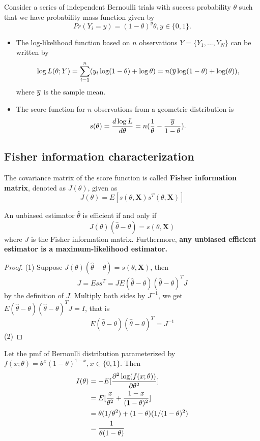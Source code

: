\begin{refsection}
\begin{example}
Consider a series of independent Bernoulli trials with success probability $\theta$ such that we have probability mass function given by	
$$Pr(Y_i = y) = (1-\theta)^y \theta, y\in \{0,1 \}.$$

\begin{itemize}
	\item 
	The log-likelihood function based on $n$ observations $Y=\{Y_1,...,Y_N\}$ can be written by
	$$\log L(\theta; Y) = \sum_{i=1}^n (y_i \log(1-\theta) + \log \theta) = n(\overline{y}\log(1-\theta) + \log(\theta)),$$
	where $\overline{y}$ is the sample mean.
	\item 
	The score function for $n$ observations from a geometric distribution is
	$$s(\theta) = \frac{d \log L}{d \theta} = n(\frac{1}{\theta} - \frac{\overline{y}}{1-\theta}).$$
\end{itemize}
\end{example}


\subsection{Fisher information characterization}
\begin{definition}
The covariance matrix of the score function is called \textbf{Fisher information matrix}, denoted as $J(\theta)$, given as
$$J(\theta) = E[s(\theta,\bm{X})s^T(\theta,\bm{X})]$$
\end{definition}


\begin{theorem}\cite[552]{moon2000mathematical}
	An unbiased estimator $\hat{\theta}$ is efficient if and only if 
	$$J(\theta)(\hat{\theta}-\theta) = s(\theta,\bm{X})$$
	where $J$ is the Fisher information matrix.
	Furthermore, \textbf{any unbiased efficient estimator is a maximum-likelihood estimator.}
\end{theorem}
\begin{proof}
(1) Suppose $J(\theta)(\hat{\theta}-\theta) = s(\theta,\bm{X})$, then $$J = Ess^T = JE(\hat{\theta}-\theta)(\hat{\theta}-\theta)^T J$$
by the definition of $J$. Multiply both sides by $J^{-1}$, we get $E(\hat{\theta}-\theta)(\hat{\theta}-\theta)^T J = I$, that is
$$E(\hat{\theta}-\theta)(\hat{\theta}-\theta)^T = J^{-1}$$
(2)

\end{proof}

\begin{example}
	Let the pmf of Bernoulli distribution parameterized by $f(x;\theta) = \theta^x(1-\theta)^{1-x},x\in\{0,1\}$. Then
\begin{align*}
I(\theta) &= -E[\frac{\partial^2 \log(f(x;\theta))}{\partial \theta^2}] \\
&= E[\frac{x}{\theta^2} + \frac{1-x}{(1-\theta)^2}]\\
&= \theta (1/\theta^2) + (1-\theta)(1/(1-\theta)^2) \\
&= \frac{1}{\theta(1-\theta)}
\end{align*}
\end{example}




\end{refsection}
